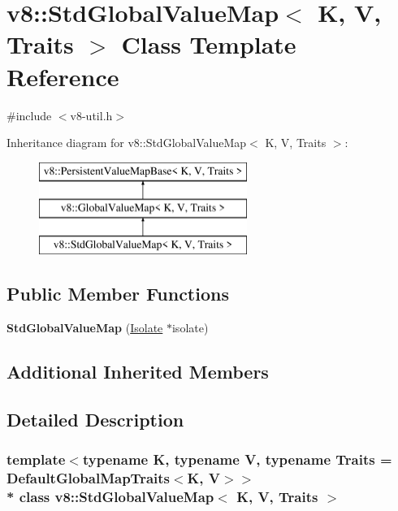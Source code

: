 \hypertarget{classv8_1_1_std_global_value_map}{}\section{v8\+:\+:Std\+Global\+Value\+Map$<$ K, V, Traits $>$ Class Template Reference}
\label{classv8_1_1_std_global_value_map}


{\ttfamily \#include $<$v8-\/util.\+h$>$}

Inheritance diagram for v8\+:\+:Std\+Global\+Value\+Map$<$ K, V, Traits $>$\+:\begin{figure}[H]
\begin{center}
\leavevmode
\includegraphics[height=3.000000cm]{classv8_1_1_std_global_value_map}
\end{center}
\end{figure}
\subsection*{Public Member Functions}
\begin{DoxyCompactItemize}
\item 
{\bfseries Std\+Global\+Value\+Map} (\hyperlink{classv8_1_1_isolate}{Isolate} $\ast$isolate)\hypertarget{classv8_1_1_std_global_value_map_af1025915a269b8b37af93ffc2ad5c3b1}{}\label{classv8_1_1_std_global_value_map_af1025915a269b8b37af93ffc2ad5c3b1}

\end{DoxyCompactItemize}
\subsection*{Additional Inherited Members}


\subsection{Detailed Description}
\subsubsection*{template$<$typename K, typename V, typename Traits = Default\+Global\+Map\+Traits$<$\+K, V$>$$>$\\*
class v8\+::\+Std\+Global\+Value\+Map$<$ K, V, Traits $>$}

